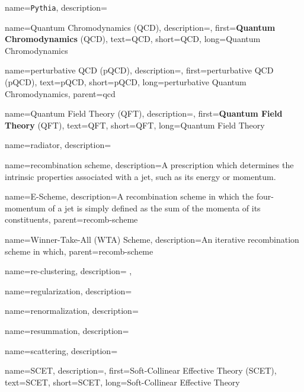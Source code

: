 {
  name=\texttt{Pythia},
  description={}
}

{
    name=Quantum Chromodynamics (QCD),
    description={},
    first={\textbf{Quantum Chromodynamics} (QCD)},
    text={QCD},
    short={QCD},
    long={Quantum Chromodynamics}
}

    {
        name=perturbative QCD (pQCD),
        description={},
        first={perturbative QCD (pQCD)},
        text={pQCD},
        short={pQCD},
        long={perturbative Quantum Chromodynamics},
        parent=qcd
    }



{
    name=Quantum Field Theory (QFT),
    description={},
    first={\textbf{Quantum Field Theory} (QFT)},
    text={QFT},
    short={QFT},
    long={Quantum Field Theory}
}


{
  name=radiator,
  description={}
}


{
  name=recombination scheme,
  description={A prescription which determines the intrinsic properties associated with a jet, such as its energy or momentum.}
}

{
  name=E-Scheme,
  description={A recombination scheme in which the four-momentum of a jet is simply defined as the sum of the momenta of its constituents},
  parent=recomb-scheme
}


{
  name=Winner-Take-All (WTA) Scheme,
  description={An iterative recombination scheme in which},
  parent=recomb-scheme
}


{
    name=re-clustering,
    description={
    },
}


{
  name=regularization,
  description={}
}

{
  name=renormalization,
  description={}
}


{
  name=resummation,
  description={}
}



{
    name=scattering,
    description={
    }
}


{
    name=SCET,
    description={},
    first={Soft-Collinear Effective Theory (SCET)},
    text={SCET},
    short={SCET},
    long={Soft-Collinear Effective Theory}
}

